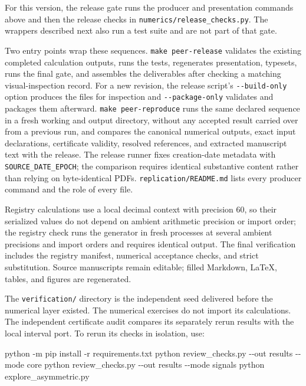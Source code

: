 \documentclass[
  11pt,
]{article}
\newenvironment{Shaded}{}{}
\newcommand{\AttributeTok}[1]{\textcolor[rgb]{0.49,0.56,0.16}{#1}}
\newcommand{\ExtensionTok}[1]{#1}
\newcommand{\NormalTok}[1]{#1}
\begin{document}
For this version, the release gate runs the producer and presentation
commands above and then the release checks in
\texttt{numerics/release\_checks.py}. The wrappers described next also run a
test suite and are not part of that gate.

Two entry points wrap these sequences. \texttt{make\ peer-release}
validates the existing completed calculation outputs, runs the tests,
regenerates presentation, typesets, runs the final gate, and assembles
the deliverables after checking a matching visual-inspection record. For
a new revision, the release script's \texttt{-\/-build-only} option
produces the files for inspection and \texttt{-\/-package-only}
validates and packages them afterward. \texttt{make\ peer-reproduce}
runs the same declared sequence in a fresh working and output directory,
without any accepted result carried over from a previous run, and
compares the canonical numerical outputs, exact input declarations,
certificate validity, resolved references, and extracted manuscript text
with the release. The release runner fixes creation-date metadata with
\texttt{SOURCE\_DATE\_EPOCH}; the comparison requires identical
substantive content rather than relying on byte-identical PDFs.
\texttt{replication/README.md} lists every producer command and the role
of every file.

Registry calculations use a local decimal context with precision 60, so
their serialized values do not depend on ambient arithmetic precision or
import order; the registry check runs the generator in fresh processes
at several ambient precisions and import orders and requires identical
output. The final verification includes the registry manifest, numerical
acceptance checks, and strict substitution. Source manuscripts remain
editable; filled Markdown, LaTeX, tables, and figures are regenerated.

The \texttt{verification/} directory is the independent seed delivered
before the numerical layer existed. The numerical exercises do not
import its calculations. The independent certificate audit compares its
separately rerun results with the local interval port. To rerun its
checks in isolation, use:

\begin{Shaded}
\begin{Highlighting}[]
\ExtensionTok{python} \AttributeTok{{-}m}\NormalTok{ pip install }\AttributeTok{{-}r}\NormalTok{ requirements.txt}
\ExtensionTok{python}\NormalTok{ review\_checks.py }\AttributeTok{{-}{-}out}\NormalTok{ results }\AttributeTok{{-}{-}mode}\NormalTok{ core}
\ExtensionTok{python}\NormalTok{ review\_checks.py }\AttributeTok{{-}{-}out}\NormalTok{ results }\AttributeTok{{-}{-}mode}\NormalTok{ signals}
\ExtensionTok{python}\NormalTok{ explore\_asymmetric.py}
\end{Highlighting}
\end{Shaded}
\end{document}

